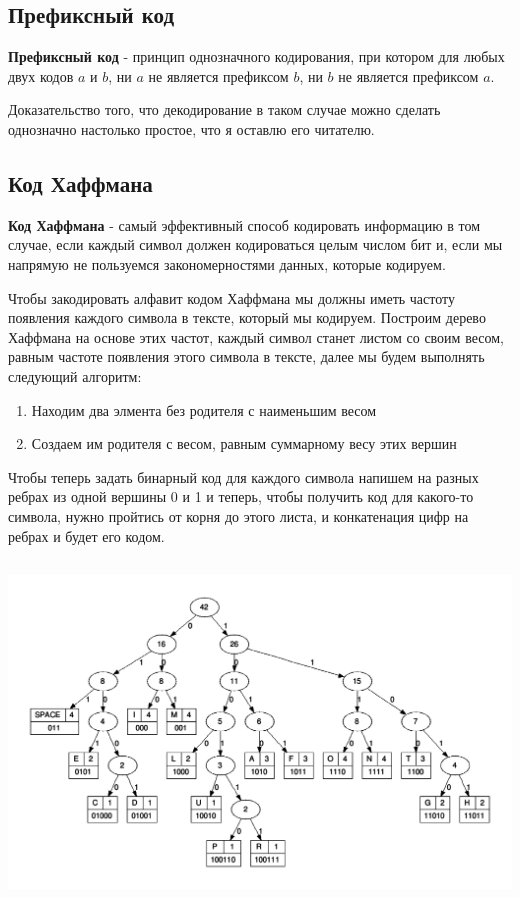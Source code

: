 
\subsection{Префиксный код}
\textbf{Префиксный код} - принцип однозначного кодирования, при котором для любых двух кодов $a$ и $b$, ни $a$ не является префиксом $b$, ни $b$ не является префиксом $a$.

Доказательство того, что декодирование в таком случае можно сделать однозначно настолько простое, что я оставлю его читателю. 

\subsection{Код Хаффмана}
\textbf{Код Хаффмана} - самый эффективный способ кодировать информацию в том случае, если каждый символ должен кодироваться целым числом бит и, если мы напрямую не пользуемся закономерностями данных, которые кодируем. 

Чтобы закодировать алфавит кодом Хаффмана мы должны иметь частоту появления каждого символа в тексте, который мы кодируем. Построим дерево Хаффмана на основе этих частот, каждый символ станет листом со своим весом, равным частоте появления этого символа в тексте, далее мы будем выполнять следующий алгоритм:
\begin{enumerate}
    \item Находим два элмента без родителя с наименьшим весом
    \item Создаем им родителя с весом, равным суммарному весу этих вершин
\end{enumerate}

Чтобы теперь задать бинарный код для каждого символа напишем на разных ребрах из одной вершины 0 и 1 и теперь, чтобы получить код для какого-то символа, нужно пройтись от корня до этого листа, и конкатенация цифр на ребрах и будет его кодом.
\begin{center}
  \includegraphics[height=9.1cm]{assets/huffman.png}
\end{center}

